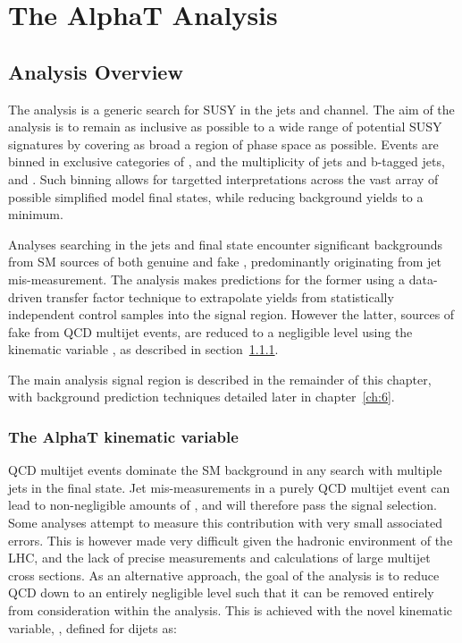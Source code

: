\chapter{The AlphaT Analysis}
\label{ch:5}

\ifpdf
    \graphicspath{{Chapter5/Figs/Raster/}{Chapter5/Figs/PDF/}{Chapter5/Figs/}}
\else
    \graphicspath{{Chapter5/Figs/Vector/}{Chapter5/Figs/}}
\fi


\section{Analysis Overview}  %
\label{sec:selection_analysis_overview}

The \alphat analysis is a generic search for SUSY in the jets and 
\met channel. The aim of the analysis is to remain as inclusive as possible to a
wide range of potential SUSY signatures by covering as broad a region of phase 
space as possible. Events are binned in exclusive categories of \HT, 
and the multiplicity of jets and b-tagged jets,  
\nj and \nb. Such binning allows for targetted interpretations across
the vast array of
possible simplified model final states, while reducing background yields to a 
minimum.

Analyses searching in the jets and \met final state encounter significant 
backgrounds from SM sources of both genuine  
and fake \met, predominantly originating from jet mis-measurement. The \alphat 
analysis makes predictions for the former using a data-driven transfer factor 
technique to extrapolate yields from statistically independent control samples 
into the signal region. However the latter, sources of fake \met from QCD multijet events,
are reduced to a negligible level using the kinematic 
variable \alphat, as described in section~\ref{sec:alphat}.

The main analysis signal region is described in the remainder of this chapter,
with background prediction techniques detailed later in chapter~\ref{ch:6}.


\subsection{The AlphaT kinematic variable}
\label{sec:alphat}

QCD multijet events dominate the SM background in any search with multiple jets 
in the final state. Jet mis-measurements in a 
purely QCD multijet event can lead to non-negligible amounts of \mht, and will 
therefore pass the signal selection. 
Some analyses attempt
to measure this contribution with very small associated errors. This is however 
made very difficult given the hadronic environment of the LHC, and the lack of 
precise measurements and calculations of large multijet cross sections. As an 
alternative approach, the goal of the 
\alphat analysis is to reduce QCD down to an entirely negligible level such that 
it can be removed entirely from consideration within the analysis. This is 
achieved with the novel kinematic variable, \alphat [REF], defined for dijets as:

